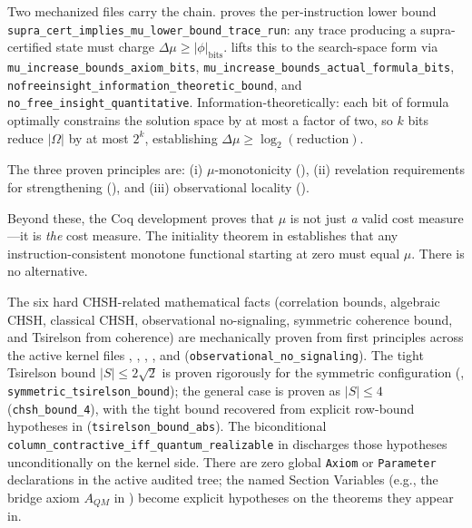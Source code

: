 Two mechanized files carry the chain.  proves the per-instruction lower bound \texttt{supra\_cert\_implies\_mu\_lower\_bound\_trace\_run}: any trace producing a supra-certified state must charge $\Delta\mu \ge |\phi|_{\text{bits}}$.  lifts this to the search-space form via \texttt{mu\_increase\_bounds\_axiom\_bits}, \texttt{mu\_increase\_bounds\_actual\_formula\_bits}, \texttt{nofreeinsight\_information\_theoretic\_bound}, and \texttt{no\_free\_insight\_quantitative}. Information-theoretically: each bit of formula optimally constrains the solution space by at most a factor of two, so $k$ bits reduce $|\Omega|$ by at most $2^k$, establishing $\Delta\mu \ge \log_2(\text{reduction})$.

The three proven principles are: (i) $\mu$-monotonicity (), (ii) revelation requirements for strengthening (), and (iii) observational locality ().

Beyond these, the Coq development proves that $\mu$ is not just \emph{a} valid cost measure---it is \emph{the} cost measure. The initiality theorem in  establishes that any instruction-consistent monotone functional starting at zero must equal $\mu$. There is no alternative.

The six hard CHSH-related mathematical facts (correlation bounds, algebraic CHSH, classical CHSH, observational no-signaling, symmetric coherence bound, and Tsirelson from coherence) are mechanically proven from first principles across the active kernel files , , , , and  (\texttt{observational\_no\_signaling}). The tight Tsirelson bound $|S| \le 2\sqrt{2}$ is proven rigorously for the symmetric configuration (, \texttt{symmetric\_tsirelson\_bound}); the general case is proven as $|S| \le 4$ (\texttt{chsh\_bound\_4}), with the tight bound recovered from explicit row-bound hypotheses in  (\texttt{tsirelson\_bound\_abs}). The biconditional \texttt{column\_contractive\_iff\_quantum\_realizable} in  discharges those hypotheses unconditionally on the kernel side. There are zero global \texttt{Axiom} or \texttt{Parameter} declarations in the active audited tree; the named Section Variables (e.g., the bridge axiom $A_{QM}$ in ) become explicit hypotheses on the theorems they appear in.

